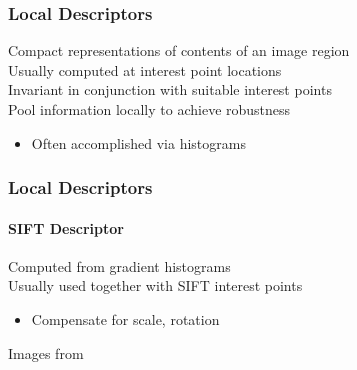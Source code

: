 \documentclass[xetex,professionalfont]{beamer}
\begin{document}

\begin{frame}
\frametitle{Local Descriptors}

Compact representations of contents of an image region\\\medskip
Usually computed at interest point locations\\\medskip %
Invariant in conjunction with suitable interest points\\\medskip %
Pool information locally to achieve robustness %
\begin{itemize}
	\item Often accomplished via histograms
\end{itemize}

\end{frame}


\begin{frame}
\frametitle{Local Descriptors}
\framesubtitle{SIFT Descriptor}

Computed from gradient histograms\\\medskip
Usually used together with SIFT interest points
\begin{itemize}
	\item Compensate for scale, rotation %
\end{itemize}

\begin{center}
	{\centering Images from \cite{prince12}}
\end{center}

\end{frame}
\end{document}
